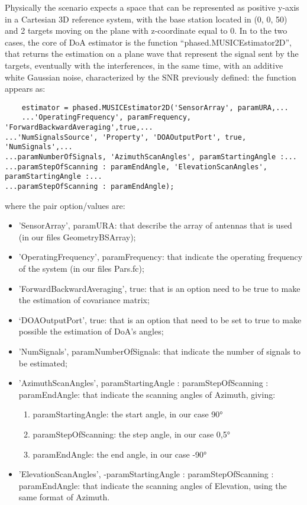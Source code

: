 \documentclass[a4paper,10pt]{article}
\begin{document}
Physically the scenario expects a space that can be represented as positive y-axis in a Cartesian 3D reference system, with the base station located in (0, 0, 50) and 2 targets moving on the plane with z-coordinate equal to 0. In to the two cases, the core of DoA estimator is the function “phased.MUSICEstimator2D”, that returns the estimation on a plane wave that represent the signal sent by the targets, eventually with the interferences, in the same time, with an additive white Gaussian noise, characterized by the SNR previously defined: the function appears as:
\begin{verbatim}
    estimator = phased.MUSICEstimator2D('SensorArray', paramURA,...
    ...'OperatingFrequency', paramFrequency, 'ForwardBackwardAveraging',true,...
...'NumSignalsSource', 'Property', 'DOAOutputPort', true, 'NumSignals',...
...paramNumberOfSignals, 'AzimuthScanAngles', paramStartingAngle :...
...paramStepOfScanning : paramEndAngle, 'ElevationScanAngles', paramStartingAngle :...
...paramStepOfScanning : paramEndAngle);
\end{verbatim}


where the pair option/values are:
\begin{itemize}
    \item 'SensorArray', paramURA: that describe the array of antennas that is used (in our files GeometryBSArray);
    \item'OperatingFrequency', paramFrequency: that indicate the operating frequency of the system (in our files Pars.fc);
    \item 'ForwardBackwardAveraging', true: that is an option need to be true to make the estimation of covariance matrix;
    \item ‘DOAOutputPort', true: that is an option that need to be set to true to make possible the estimation of DoA’s angles;
    \item 'NumSignals', paramNumberOfSignals: that indicate the number of signals to be estimated;
    \item 'AzimuthScanAngles', paramStartingAngle : paramStepOfScanning : paramEndAngle: that indicate the scanning angles of Azimuth, giving:
    \begin{enumerate}
        \item paramStartingAngle: the start angle, in our case 90°
        \item paramStepOfScanning: the step angle, in our case 0,5°
        \item paramEndAngle: the end angle, in our case -90°
    \end{enumerate}
    \item 'ElevationScanAngles', -paramStartingAngle : paramStepOfScanning : paramEndAngle: that indicate the scanning angles of Elevation, using the same format of Azimuth.
\end{itemize}
\end{document}
